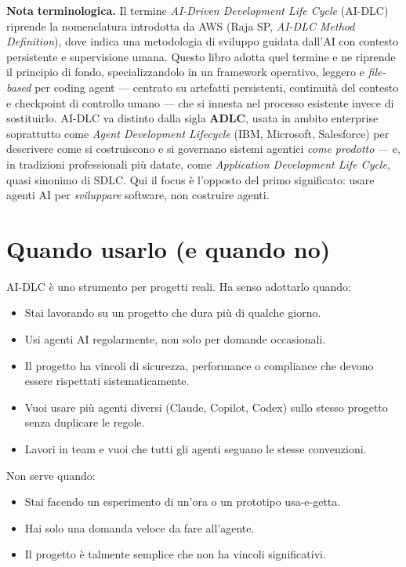 \begin{notebox}
\textbf{Nota terminologica.} Il termine \textit{AI-Driven Development Life Cycle} (AI-DLC) riprende la nomenclatura introdotta da AWS (Raja SP, \textit{AI-DLC Method Definition}), dove indica una metodologia di sviluppo guidata dall'AI con contesto persistente e supervisione umana. Questo libro adotta quel termine e ne riprende il principio di fondo, specializzandolo in un framework operativo, leggero e \textit{file-based} per coding agent --- centrato su artefatti persistenti, continuità del contesto e checkpoint di controllo umano --- che si innesta nel processo esistente invece di sostituirlo. AI-DLC va distinto dalla sigla \textbf{ADLC}, usata in ambito enterprise soprattutto come \textit{Agent Development Lifecycle} (IBM, Microsoft, Salesforce) per descrivere come si costruiscono e si governano sistemi agentici \textit{come prodotto} --- e, in tradizioni professionali più datate, come \textit{Application Development Life Cycle}, quasi sinonimo di SDLC. Qui il focus è l'opposto del primo significato: usare agenti AI per \textit{sviluppare} software, non costruire agenti.
\end{notebox}

\section{Quando usarlo (e quando no)}
\label{sec:01-quando-usarlo}

AI-DLC è uno strumento per progetti reali. Ha senso adottarlo quando:

\begin{itemize}
  \item Stai lavorando su un progetto che dura più di qualche giorno.
  \item Usi agenti AI regolarmente, non solo per domande occasionali.
  \item Il progetto ha vincoli di sicurezza, performance o compliance che devono essere rispettati sistematicamente.
  \item Vuoi usare più agenti diversi (Claude, Copilot, Codex) sullo stesso progetto senza duplicare le regole.
  \item Lavori in team e vuoi che tutti gli agenti seguano le stesse convenzioni.
\end{itemize}

Non serve quando:

\begin{itemize}
  \item Stai facendo un esperimento di un'ora o un prototipo usa-e-getta.
  \item Hai solo una domanda veloce da fare all'agente.
  \item Il progetto è talmente semplice che non ha vincoli significativi.
\end{itemize}

